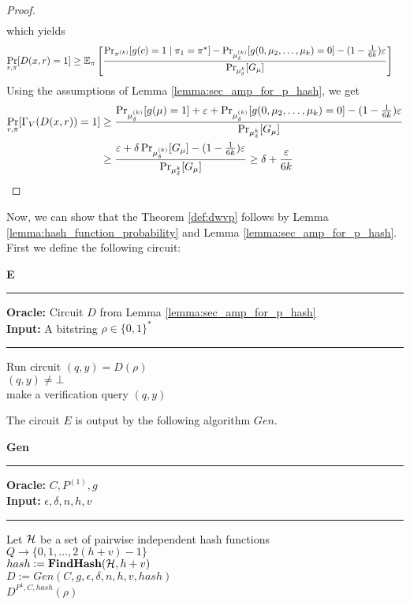 \begin{proof}
\begin{align*}
\end{align*}
which yields
\begin{align*}
  \underset{r,\pi}{\Pr}[D(x,r) = 1]
&\geq \mathbb{E}_{\pi}\left[\frac{{\Pr}_{\pi^{(k)}}[g(c) = 1 \mid \pi_1 = \pi^*] -
{\Pr}_{\mu_{\delta}^{(k)}}[g(0, \mu_2, \dots, \mu_k) = 0] - (1 - \frac{1}{6k})\epsilon} {{\Pr}_{\mu_{\delta}^{k}}[G_{\mu}]}\right] \notag
 \end{align*}
 Using the assumptions of Lemma \ref{lemma:sec_amp_for_p_hash}, we get
 \begin{align}
   \label{eq:proof_final}
   \underset{r,\pi}{\Pr}[\Gamma_V(D(x,r)) = 1]
 &\geq \frac{ {\Pr}_{\mu_{\delta}^{(k)}}[g(\mu) = 1] + \epsilon +
 \Pr_{\mu_{\delta}^{(k)}}[g(0, \mu_2, \dots, \mu_k) = 0] - (1 - \frac{1}{6k})\epsilon}
 {\Pr_{\mu_{\delta}^{k}}[G_{\mu}]} \notag\\
 &\geq \frac{\epsilon +
\delta\Pr_{\mu_{\delta}^{(k)}}[G_{\mu}] - (1 - \frac{1}{6k})\epsilon}
{\Pr_{\mu_{\delta}^{k}}[G_{\mu}]} \geq \delta + \frac{\epsilon}{6k}
\end{align}
\end{proof}
Now, we can show that the Theorem \ref{def:dwvp} follows by Lemma \ref{lemma:hash_function_probability} and Lemma \ref{lemma:sec_amp_for_p_hash}.
First we define the following circuit:
\begin{codeblock}
  \textbf{E}
  \medskip
  \hrule
  \medskip
  \textbf{Oracle:} Circuit $D$ from Lemma \ref{lemma:sec_amp_for_p_hash}  \\
  \textbf{Input:} A bitstring $\rho \in \{0,1\}^{*}$
  \medskip\hrule\medskip
  Run circuit $(q,y) = D(\rho)$ \\
  \If $(q,y) \neq \bot$ \then \\
  \IndI make a verification query $(q,y)$
\end{codeblock}
%
The circuit $E$ is output by the following algorithm $Gen$.
\begin{codeblock}
  \textbf{Gen}
  \medskip
  \hrule
  \medskip
  \textbf{Oracle:}  $C, P^{(1)}, g$\\
  \textbf{Input:} $\epsilon, \delta, n, h, v$
  \medskip\hrule\medskip
  Let $\cH$ be a set of pairwise independent hash functions $Q \rightarrow \{0, 1, \dots, 2(h+v)-1\}$ \\
  $hash := \textbf{FindHash}(\cH,h+v)$ \\
  $D := Gen(C, g, \epsilon, \delta, n, h, v, hash)$ \\
  \return $D^{P^{1}, C, hash}(\rho)$
\end{codeblock}
